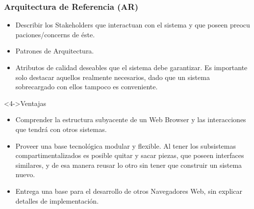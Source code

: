 \documentclass[serif,9pt]{beamer}
\begin{document}
\begin{frame}
	\frametitle{Arquitectura de Referencia (AR)}
	\begin{itemize}
		\item<1-> Describir los Stakeholders que interactuan con el sistema y que poseen preocu paciones/concerns de \'este.
		\item<2-> Patrones de Arquitectura.
		\item<3-> Atributos de calidad deseables que el sistema debe garantizar. Es importante solo destacar aquellos realmente necesarios, dado que un sistema sobrecargado con ellos tampoco es conveniente.
	\end{itemize}
	\begin{block}<4->{Ventajas}
		\begin{itemize}
			\item<5-> Comprender la estructura subyacente de un Web Browser y las interacciones que tendr\'a con otros sistemas.
			\item<6-> Proveer una base tecnol\'ogica modular y flexible. Al tener los subsistemas compartimentalizados es posible quitar y sacar piezas, que poseen interfaces similares, y de esa manera reusar lo otro sin tener que construir un sistema nuevo.
			\item<7-> Entrega una base para el desarrollo de otros Navegadores Web, sin explicar detalles de implementaci\'on.
		\end{itemize}
	\end{block}
\end{frame}
\end{document}
